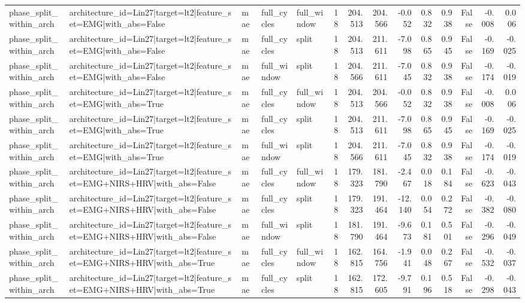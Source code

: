 \begin{table}
\begin{tabular}{lllllrrrrrrrrr}
phase_split_within_arch & architecture_id=Lin27|target=lt2|feature_set=EMG|with_abs=False & mae & full_cycles & full_window & 18 & 204.513 & 204.566 & -0.052 & 0.832 & 0.938 & False & -0.008 & 0.006 \\
phase_split_within_arch & architecture_id=Lin27|target=lt2|feature_set=EMG|with_abs=False & mae & full_cycles & split & 18 & 204.513 & 211.611 & -7.098 & 0.865 & 0.945 & False & -0.169 & -0.025 \\
phase_split_within_arch & architecture_id=Lin27|target=lt2|feature_set=EMG|with_abs=False & mae & full_window & split & 18 & 204.566 & 211.611 & -7.045 & 0.832 & 0.938 & False & -0.174 & -0.019 \\
phase_split_within_arch & architecture_id=Lin27|target=lt2|feature_set=EMG|with_abs=True & mae & full_cycles & full_window & 18 & 204.513 & 204.566 & -0.052 & 0.832 & 0.938 & False & -0.008 & 0.006 \\
phase_split_within_arch & architecture_id=Lin27|target=lt2|feature_set=EMG|with_abs=True & mae & full_cycles & split & 18 & 204.513 & 211.611 & -7.098 & 0.865 & 0.945 & False & -0.169 & -0.025 \\
phase_split_within_arch & architecture_id=Lin27|target=lt2|feature_set=EMG|with_abs=True & mae & full_window & split & 18 & 204.566 & 211.611 & -7.045 & 0.832 & 0.938 & False & -0.174 & -0.019 \\
phase_split_within_arch & architecture_id=Lin27|target=lt2|feature_set=EMG+NIRS+HRV|with_abs=False & mae & full_cycles & full_window & 18 & 179.323 & 181.790 & -2.467 & 0.018 & 0.184 & False & -0.623 & -0.043 \\
phase_split_within_arch & architecture_id=Lin27|target=lt2|feature_set=EMG+NIRS+HRV|with_abs=False & mae & full_cycles & split & 18 & 179.323 & 191.464 & -12.140 & 0.054 & 0.272 & False & -0.382 & -0.080 \\
phase_split_within_arch & architecture_id=Lin27|target=lt2|feature_set=EMG+NIRS+HRV|with_abs=False & mae & full_window & split & 18 & 181.790 & 191.464 & -9.673 & 0.181 & 0.501 & False & -0.296 & -0.049 \\
phase_split_within_arch & architecture_id=Lin27|target=lt2|feature_set=EMG+NIRS+HRV|with_abs=True & mae & full_cycles & full_window & 18 & 162.815 & 164.756 & -1.941 & 0.048 & 0.267 & False & -0.532 & -0.037 \\
phase_split_within_arch & architecture_id=Lin27|target=lt2|feature_set=EMG+NIRS+HRV|with_abs=True & mae & full_cycles & split & 18 & 162.815 & 172.605 & -9.791 & 0.196 & 0.518 & False & -0.298 & -0.043 \\

\end{tabular}
\end{table}
